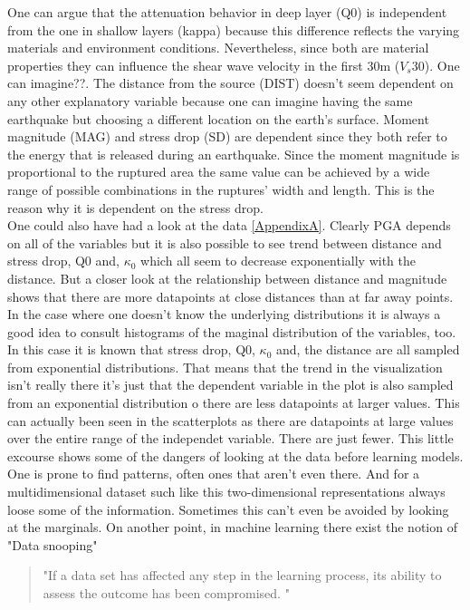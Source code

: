 One can argue that the attenuation behavior in deep layer (Q0) is independent from the one in shallow layers (kappa) because this difference reflects the varying materials and environment conditions. Nevertheless, since both are material properties they can influence the shear wave velocity in the first 30m ($V_s30$). One can imagine??.  The distance from the source (DIST) doesn't seem dependent on any other explanatory variable because one can imagine having the same earthquake but choosing a different location on the earth's surface. Moment magnitude (MAG) and stress drop (SD) are dependent since they both refer to the energy that is released during an earthquake. Since the moment magnitude is proportional to the ruptured area the same value can be achieved by a wide range of possible combinations in the ruptures' width and length. This is the reason why it is dependent on the stress drop.\\
One could also have had a look at the data \ref{AppendixA}. Clearly PGA depends on all of the variables but it is also possible to see trend between distance and stress drop, Q0 and, $\kappa_0$ which all seem to decrease exponentially with the distance. But a closer look at the relationship between distance and magnitude shows that there are more datapoints at close distances than at far away points. In the case where one doesn't know the underlying distributions it is always a good idea to consult histograms of the maginal distribution of the variables, too. In this case it is known that stress drop, Q0, $\kappa_0$ and, the distance are all sampled from exponential distributions. That means that the trend in the visualization isn't really there it's just that the dependent variable in the plot is also sampled from an exponential distribution o there are less datapoints at larger values. This can actually been seen in the scatterplots as there are datapoints at large values over the entire range of the independet variable. There are just fewer. This little excourse shows some of the dangers of looking at the data before learning models. One is prone to find patterns, often ones that aren't even there. And for a multidimensional dataset such like this two-dimensional representations always loose some of the information. Sometimes this can't even be avoided by looking at the marginals. On another point, in machine learning there exist the notion of "Data snooping"
\begin{quote}
"If a data set has affected any step in the learning process, its ability to assess the outcome has been compromised. \citep{LearningFromData}"
\end{quote}
